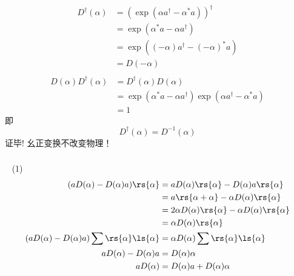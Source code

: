  \begin{frame}
       \frametitle{} 
       \例 [5. 试证明平移算符是幺正算符 ]{}
       \证 ~
    \[ 
    \begin{aligned}
        D^\dagger (\alpha) &= (\exp \left(\alpha a^{\dagger}-\alpha^{*} a\right) )^\dagger \\
        &= \exp \left(\alpha^* a-\alpha a^\dagger \right)  \\
        &= \exp \left( (-\alpha) a^\dagger- (-\alpha)^* a \right)  \\
        &= D (-\alpha)  \\
    \end{aligned}  
    \]  
    \[ 
    \begin{aligned}
        D (\alpha)D^\dagger (\alpha) &= D^\dagger (\alpha)D (\alpha) \\
        &= \exp \left(\alpha^* a-\alpha a^\dagger \right) \exp \left(\alpha a^{\dagger}-\alpha^{*} a\right)  \\
        &=1
    \end{aligned}  
    \]  
    即
    \[   D^\dagger (\alpha)= D^{-1} (\alpha)  \]
    证毕! \hspace*{3em} 幺正变换不改变物理！
\end{frame}

\begin{frame}
      \frametitle{}
      \例 [6. 试证明位移算符有如下性质 ]{
        \[ \begin{aligned}
        (1)\ & a D (\alpha) =  D (\alpha) a  +  D (\alpha)\alpha \\
        (2)\ & D^\dagger (\alpha) a D (\alpha) = a + \alpha \\
        (3)\ & D^\dagger (\alpha) a^\dagger D (\alpha) = a^\dagger + \alpha^*    
    \end{aligned}  
    \] }
      \证~ (1)~
    \[ 
      \begin{aligned}
        (a D (\alpha) -  D (\alpha) a) \rs{\alpha} &= a D (\alpha) \rs{\alpha}- D (\alpha) a \rs{\alpha} \\ 
        &= a \rs{\alpha+\alpha} - \alpha D (\alpha) \rs{\alpha} \\
        &= 2\alpha D (\alpha) \rs{\alpha} -  \alpha D (\alpha) \rs{\alpha} \\
        &= \alpha D (\alpha) \rs{\alpha} \\
        (a D (\alpha) -  D (\alpha) a) \sum \rs{\alpha}\ls{\alpha } &=  \alpha D (\alpha) \sum\rs{\alpha}\ls{\alpha }  \\ 
        a D (\alpha) -  D (\alpha) a &=  D (\alpha) \alpha  \\ 
        a D (\alpha) &= D (\alpha)  a + D (\alpha) \alpha  \\ 
    \end{aligned}  
    \] 
\end{frame}

